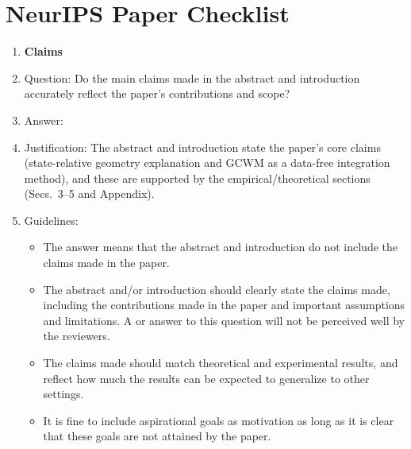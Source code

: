 \documentclass{article}
\begin{document}
\FloatBarrier

\newpage
\section*{NeurIPS Paper Checklist}



\begin{enumerate}

\item {\bf Claims}
    \item[] Question: Do the main claims made in the abstract and introduction accurately reflect the paper's contributions and scope?
    \item[] Answer: \answerYes{} %
    \item[] Justification: The abstract and introduction state the paper's core claims (state-relative geometry explanation and GCWM as a data-free integration method), and these are supported by the empirical/theoretical sections (Secs.~3--5 and Appendix).
    \item[] Guidelines:
    \begin{itemize}
        \item The answer \answerNA{} means that the abstract and introduction do not include the claims made in the paper.
        \item The abstract and/or introduction should clearly state the claims made, including the contributions made in the paper and important assumptions and limitations. A \answerNo{} or \answerNA{} answer to this question will not be perceived well by the reviewers. 
        \item The claims made should match theoretical and experimental results, and reflect how much the results can be expected to generalize to other settings. 
        \item It is fine to include aspirational goals as motivation as long as it is clear that these goals are not attained by the paper. 
    \end{itemize}


\end{enumerate}
\end{document}
